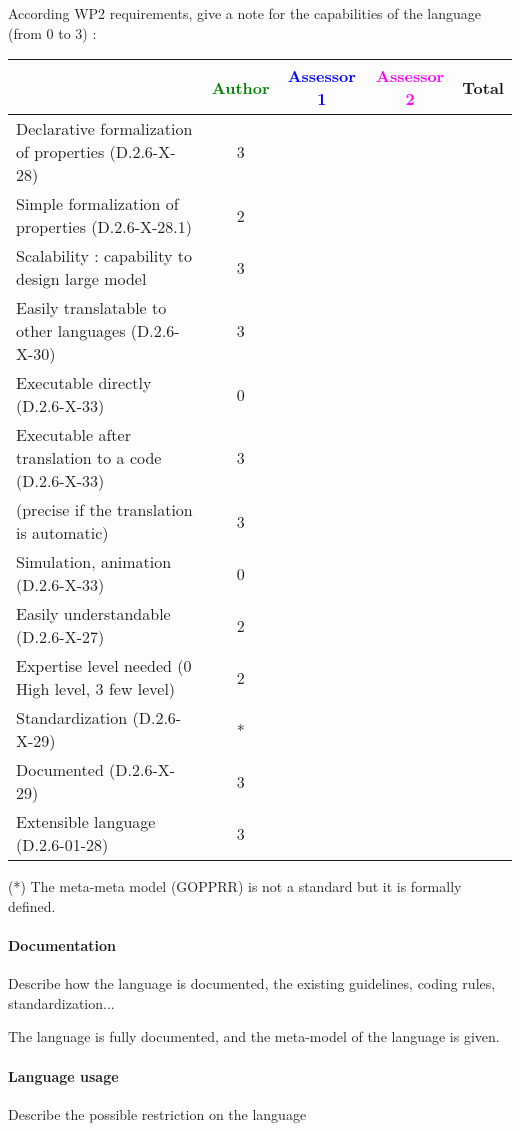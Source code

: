 According WP2 requirements, give a note for the capabilities of the language (from 0 to 3) :

\begin{tabular}{|l | c | c | c | c|}
  \hline
  & \textcolor{green}{Author} & \textcolor{blue}{Assessor 1} & \textcolor{magenta}{Assessor 2} & Total \\
  \hline
  Declarative formalization of properties (D.2.6-X-28) &3 & & & \\
  \hline
  Simple formalization of properties (D.2.6-X-28.1) & 2& & & \\
  \hline
  Scalability : capability to design large model & 3 & & & \\
  \hline
  Easily translatable to other languages (D.2.6-X-30) &3 & & & \\
  \hline
  Executable directly (D.2.6-X-33) &0 & & & \\
  \hline
  Executable after translation to a code (D.2.6-X-33) &3 & & & \\
  (precise if the translation is automatic) &3 & & & \\
  \hline
  Simulation, animation (D.2.6-X-33) &0 & & & \\
  \hline
  Easily understandable (D.2.6-X-27) &2 & & & \\
  \hline
  Expertise level needed (0 High level, 3 few level) &2 & & & \\
  \hline
  Standardization (D.2.6-X-29) &* & & & \\
  \hline
  Documented (D.2.6-X-29) &3 & & & \\
  \hline
  Extensible language (D.2.6-01-28) &3 & & & \\
  \hline
\end{tabular}

\begin{author_comment}
(*) The meta-meta model (GOPPRR) is not a standard but it is formally defined.
\end{author_comment}

\paragraph{Documentation} Describe how the language is documented, the existing guidelines, coding rules, standardization...

The language is fully documented, and the meta-model of the language
is given.
\paragraph{Language usage} Describe the possible restriction on the language

